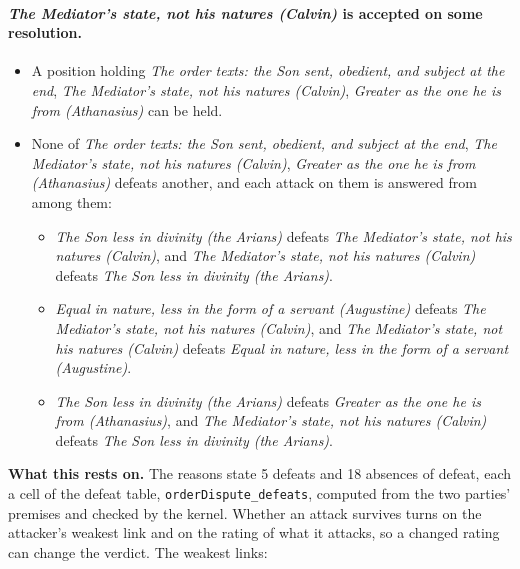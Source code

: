 \documentclass[11pt,paper=\testimonypaper,DIV=13,parskip=false]{scrartcl}
\begin{document}
\paragraph{\emph{The Mediator’s state, not his natures (Calvin)} is accepted on some resolution.}
\begin{itemize}
\item A position holding \emph{The order texts: the Son sent, obedient, and subject at the end}, \emph{The Mediator’s state, not his natures (Calvin)}, \emph{Greater as the one he is from (Athanasius)} can be held.
\item None of \emph{The order texts: the Son sent, obedient, and subject at the end}, \emph{The Mediator’s state, not his natures (Calvin)}, \emph{Greater as the one he is from (Athanasius)} defeats another, and each attack on them is answered from among them:
\begin{itemize}
\item \emph{The Son less in divinity (the Arians)} defeats \emph{The Mediator’s state, not his natures (Calvin)}, and \emph{The Mediator’s state, not his natures (Calvin)} defeats \emph{The Son less in divinity (the Arians)}.
\item \emph{Equal in nature, less in the form of a servant (Augustine)} defeats \emph{The Mediator’s state, not his natures (Calvin)}, and \emph{The Mediator’s state, not his natures (Calvin)} defeats \emph{Equal in nature, less in the form of a servant (Augustine)}.
\item \emph{The Son less in divinity (the Arians)} defeats \emph{Greater as the one he is from (Athanasius)}, and \emph{The Mediator’s state, not his natures (Calvin)} defeats \emph{The Son less in divinity (the Arians)}.
\end{itemize}
\end{itemize}
\par\noindent\textbf{What this rests on.} The reasons state 5 defeats and 18 absences of defeat, each a cell of the defeat table, \texttt{order\allowbreak{}Dispute\_\allowbreak{}defeats}, computed from the two parties' premises and checked by the kernel. Whether an attack survives turns on the attacker's weakest link and on the rating of what it attacks, so a changed rating can change the verdict. The weakest links:
\end{document}
